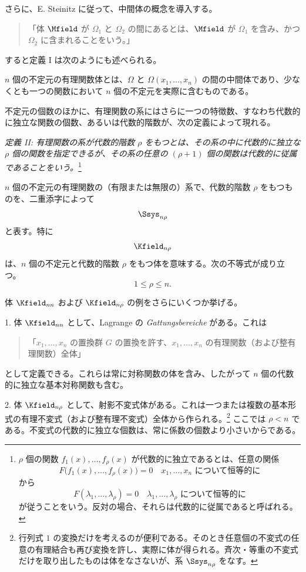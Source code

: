 \documentclass[11pt]{article}
\begin{document}
さらに、E. Steinitz に従って、中間体の概念を導入する。
\begin{quote}
「体 $\Mfield$ が $\Omega_1$ と $\Omega_2$ の間にあるとは、$\Mfield$ が $\Omega_1$ を含み、かつ $\Omega_2$ に含まれることをいう。」
\end{quote}
すると定義 I は次のようにも述べられる。

$n$ 個の不定元の有理関数体とは、$\Omega$ と $\Omega(x_1,\ldots,x_n)$ の間の中間体であり、少なくとも一つの関数において $n$ 個の不定元を実際に含むものである。

不定元の個数のほかに、有理関数の系にはさらに一つの特徴数、すなわち代数的に独立な関数の個数、あるいは代数的階数が、次の定義によって現れる。

\emph{定義 II: 有理関数の系が代数的階数 $\rho$ をもつとは、その系の中に代数的に独立な $\rho$ 個の関数を指定できるが、その系の任意の $(\rho+1)$ 個の関数は代数的に従属であることをいう。}\footnote{$\rho$ 個の関数 $f_1(x),\ldots,f_\rho(x)$ が代数的に独立であるとは、任意の関係
\[
F\bigl(f_1(x),\ldots,f_\rho(x)\bigr)=0\quad\text{$x_1,\ldots,x_n$ について恒等的に}
\]
から
\[
F(\lambda_1,\ldots,\lambda_\rho)=0\quad\text{$\lambda_1,\ldots,\lambda_\rho$ について恒等的に}
\]
が従うことをいう。反対の場合、それらは代数的に従属であると呼ばれる。}

$n$ 個の不定元の有理関数の（有限または無限の）系で、代数的階数 $\rho$ をもつものを、二重添字によって
\[
  \Ssys_{n\rho}
\]
と表す。特に
\[
  \Kfield_{n\rho}
\]
は、$n$ 個の不定元と代数的階数 $\rho$ をもつ体を意味する。次の不等式が成り立つ。
\[
  1\leq \rho\leq n.
\]

体 $\Kfield_{nn}$ および $\Kfield_{n\rho}$ の例をさらにいくつか挙げる。

1. 体 $\Kfield_{nn}$ として、Lagrange の \emph{Gattungsbereiche} がある。これは
\begin{quote}
「$x_1,\ldots,x_n$ の置換群 $G$ の置換を許す、$x_1,\ldots,x_n$ の有理関数（および整有理関数）全体」
\end{quote}
として定義できる。これらは常に対称関数の体を含み、したがって $n$ 個の代数的に独立な基本対称関数も含む。

2. 体 $\Kfield_{n\rho}$ として、射影不変式体がある。これは一つまたは複数の基本形式の有理不変式（および整有理不変式）全体から作られる。\footnote{行列式 $1$ の変換だけを考えるのが便利である。そのとき任意個の不変式の任意の有理結合も再び変換を許し、実際に体が得られる。斉次・等重の不変式だけを取り出したものは体をなさないが、系 $\Ssys_{n\rho}$ をなす。} ここでは $\rho<n$ である。不変式の代数的に独立な個数は、常に係数の個数より小さいからである。
\end{document}
